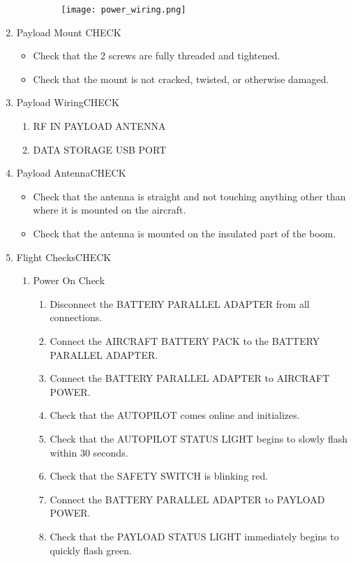 \documentclass{report}
\begin{document}
\begin{enumerate}
\begin{itemize}
\begin{figure}[ht]
							\texttt{[image: power\_wiring.png]}
							\label{fig:power_wiring_diag}
						\end{figure}
				\end{itemize}
			\item Payload Mount \hrulefill CHECK
				\begin{itemize}
					\item Check that the 2 screws are fully threaded and tightened.
					\item Check that the mount is not cracked, twisted, or otherwise damaged.
				\end{itemize}
			\item Payload Wiring\hrulefill CHECK
				\begin{enumerate}
					\item RF IN \dotfill PAYLOAD ANTENNA
					\item DATA STORAGE \dotfill USB PORT
				\end{enumerate}
			\item Payload Antenna\hrulefill CHECK
				\begin{itemize}
					\item Check that the antenna is straight and not touching anything other than where it is mounted on the aircraft.
					\item Check that the antenna is mounted on the insulated part of the boom.
				\end{itemize}
			\item Flight Checks\hrulefill CHECK
				\begin{enumerate}
					\item Power On Check
						\begin{enumerate}
							\item Disconnect the BATTERY PARALLEL ADAPTER from all connections.
							\item Connect the AIRCRAFT BATTERY PACK to the BATTERY PARALLEL ADAPTER.
							\item Connect the BATTERY PARALLEL ADAPTER to AIRCRAFT POWER.
							\item Check that the AUTOPILOT comes online and initializes.
							\item Check that the AUTOPILOT STATUS LIGHT begins to slowly flash within 30 seconds.
							\item Check that the SAFETY SWITCH is blinking red.
							\item Connect the BATTERY PARALLEL ADAPTER to PAYLOAD POWER.
							\item Check that the PAYLOAD STATUS LIGHT immediately begins to quickly flash green.

\end{enumerate}
\end{enumerate}
\end{enumerate}
\end{document}
